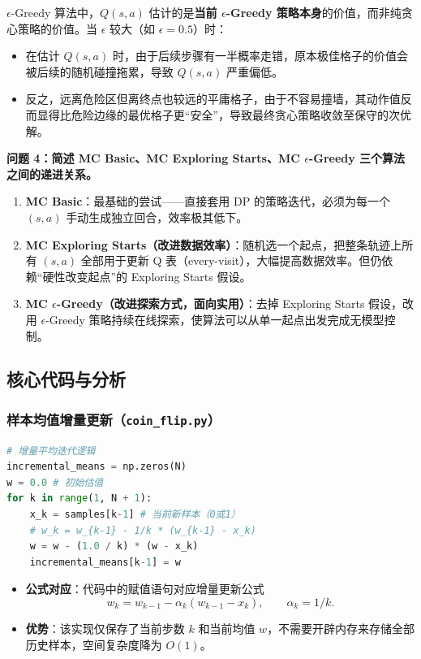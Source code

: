 \documentclass[11pt,a4paper,UTF8]{ctexart}
\numberwithin{figure}{section}
\numberwithin{table}{section}
\newcommand{\answerlabel}{%
  \par\smallskip\noindent{\heiti\bfseries 回答：}\quad}
\begin{document}
\answerlabel $\epsilon$-Greedy 算法中，$Q(s,a)$ 估计的是\textbf{当前 $\epsilon$-Greedy 策略本身}的价值，而非纯贪心策略的价值。当 $\epsilon$ 较大（如 $\epsilon=0.5$）时：
\begin{itemize}
\item 在估计 $Q(s,a)$ 时，由于后续步骤有一半概率走错，原本极佳格子的价值会被后续的随机碰撞拖累，导致 $Q(s,a)$ 严重偏低。
\item 反之，远离危险区但离终点也较远的平庸格子，由于不容易撞墙，其动作值反而显得比危险边缘的最优格子更``安全''，导致最终贪心策略收敛至保守的次优解。
\end{itemize}


\textbf{问题 4：简述 MC Basic、MC Exploring Starts、MC $\epsilon$-Greedy 三个算法之间的递进关系。}


\answerlabel 
\begin{enumerate}
\item \textbf{MC Basic}：最基础的尝试——直接套用 DP 的策略迭代，必须为每一个 $(s,a)$ 手动生成独立回合，效率极其低下。
\item \textbf{MC Exploring Starts（改进数据效率）}：随机选一个起点，把整条轨迹上所有 $(s,a)$ 全部用于更新 Q 表（every-visit），大幅提高数据效率。但仍依赖``硬性改变起点''的 Exploring Starts 假设。
\item \textbf{MC $\epsilon$-Greedy（改进探索方式，面向实用）}：去掉 Exploring Starts 假设，改用 $\epsilon$-Greedy 策略持续在线探索，使算法可以从单一起点出发完成无模型控制。
\end{enumerate}

\subsection{核心代码与分析}

\subsubsection{样本均值增量更新（\texttt{coin\_flip.py}）}

\begin{lstlisting}[language=python]
# 增量平均迭代逻辑
incremental_means = np.zeros(N)
w = 0.0 # 初始估值
for k in range(1, N + 1):
    x_k = samples[k-1] # 当前新样本（0或1）
    # w_k = w_{k-1} - 1/k * (w_{k-1} - x_k)
    w = w - (1.0 / k) * (w - x_k)
    incremental_means[k-1] = w
\end{lstlisting}
\begin{itemize}
\item \textbf{公式对应}：代码中的赋值语句对应增量更新公式
\[
w_k = w_{k-1} - \alpha_k (w_{k-1} - x_k),\qquad \alpha_k = 1/k.
\]
\item \textbf{优势}：该实现仅保存了当前步数 $k$ 和当前均值 $w$，不需要开辟内存来存储全部历史样本，空间复杂度降为 $O(1)$。
\end{itemize}
\end{document}
